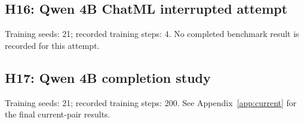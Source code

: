 \subsection{H16: Qwen 4B ChatML interrupted attempt}
\label{history:qwen4_chatml_stopped}
Training seeds: 21; recorded training steps: 4.
No completed benchmark result is recorded for this attempt.
\subsection{H17: Qwen 4B completion study}
\label{history:qwen4_completion}
Training seeds: 21; recorded training steps: 200.
See Appendix~\ref{app:current} for the final current-pair results.
